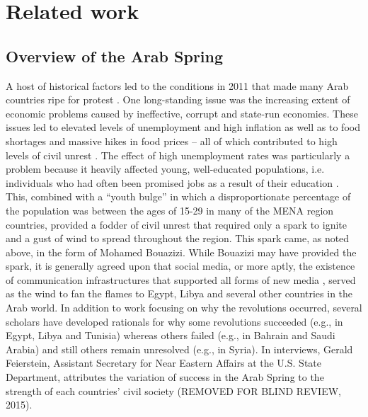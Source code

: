 \section{Related work}

\subsection{Overview of the Arab Spring}

A host of historical factors led to the conditions in 2011 that made many Arab countries ripe for protest \citep{gelvin_arab_2015}. One long-standing issue was the increasing extent of economic problems caused by ineffective, corrupt and state-run economies.  These issues led to elevated levels of unemployment and high inflation \citep{dewey_impact_2012} as well as to food shortages and massive hikes in food prices -- all of which contributed to high levels of civil unrest \citep{goldstone_cross-class_2011,comunello_will_2012}.  The effect of high unemployment rates was particularly a problem because it heavily affected young, well-educated populations, i.e. individuals who had often been promised jobs as a result of their education \citep{dewey_impact_2012,gelvin_arab_2015}. This, combined with a ``youth bulge'' in which a disproportionate percentage of the population was  between the ages of 15-29 in many of the MENA region countries, provided a fodder of civil unrest that required only a spark to ignite and a gust of wind to spread throughout the region. This spark came, as noted above, in the form of Mohamed Bouazizi.  While Bouazizi may have provided the spark, it is generally agreed upon that social media, or more aptly, the existence of communication infrastructures that supported all forms of new media \citep{wolfsfeld_social_2013,tufekci_social_2012}, served as the wind to fan the flames to Egypt, Libya and several other countries in the Arab world. In addition to work focusing on why the revolutions occurred, several scholars have developed rationals for why some revolutions succeeded (e.g., in Egypt, Libya and Tunisia) whereas others failed (e.g., in Bahrain and Saudi Arabia) and still others remain unresolved (e.g., in Syria). In interviews, Gerald Feierstein, Assistant Secretary for Near Eastern Affairs at the U.S. State Department, attributes the variation of success in the Arab Spring to the strength of each countries’ civil society (REMOVED FOR BLIND REVIEW, 2015).

